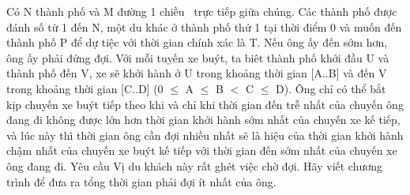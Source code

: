 Có N thành phố và M đường 1 chiều  trực tiếp giữa chúng. Các thành phố được đánh số từ 1 đến N, một du khác ở thành phố thứ 1 tại thời điểm 0 và muốn đến thành phố P để dự tiệc với thời gian chính xác là T. Nếu ông ấy đến sớm hơn, ông ấy phải đứng đợi. Với mỗi tuyến xe buýt, ta biêt thành phố khởi đầu U và thành phố đến V, xe sẽ khởi hành ở U trong khoảng thời gian [A..B] và đến V trong khoảng thời gian [C..D] (0  $\le$  A  $\le$  B $<$ C  $\le$  D). Ông chỉ có thể bắt kịp chuyến xe buýt tiếp theo khi và chỉ khi thời gian đến trễ nhất của chuyến ông đang đi không được lớn hơn thời gian khởi hành sớm nhất của chuyến xe kế tiếp, và lúc này thì thời gian ông cần đợi nhiều nhất sẽ là hiệu của thời gian khởi hành chậm nhất của chuyến xe buýt kế tiếp với thời gian đến sớm nhất của chuyến xe ông đang đi.
Yêu cầu
Vị du khách này rất ghét việc chờ đợi. Hãy viết chương trình để đưa ra tổng thời gian phải đợi ít nhất của ông.